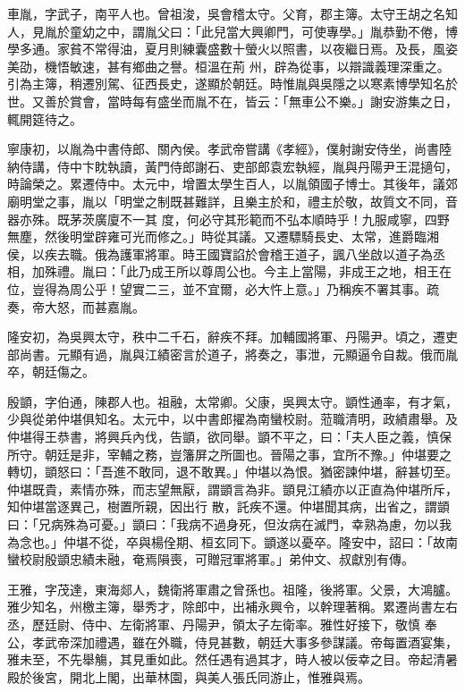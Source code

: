 \begin{pinyinscope}
 車胤，字武子，南平人也。曾祖浚，吳會稽太守。父育，郡主簿。太守王胡之名知人，見胤於童幼之中，謂胤父曰：「此兒當大興卿門，可使專學。」胤恭勤不倦，博學多通。家貧不常得油，夏月則練囊盛數十螢火以照書，以夜繼日焉。及長，風姿美劭，機悟敏速，甚有鄉曲之譽。桓溫在荊
 州，辟為從事，以辯識義理深重之。引為主簿，稍遷別駕、征西長史，遂顯於朝廷。時惟胤與吳隱之以寒素博學知名於世。又善於賞會，當時每有盛坐而胤不在，皆云：「無車公不樂。」謝安游集之日，輒開筵待之。



 寧康初，以胤為中書侍郎、關內侯。孝武帝嘗講《孝經》，僕射謝安侍坐，尚書陸納侍講，侍中卞眈執讀，黃門侍郎謝石、吏部郎袁宏執經，胤與丹陽尹王混擿句，時論榮之。累遷侍中。太元中，增置太學生百人，以胤領國子博士。其後年，議郊廟明堂之事，胤以「明堂之制既甚難詳，且樂主於和，禮主於敬，故質文不同，音器亦殊。既茅茨廣廈不一其
 度，何必守其形範而不弘本順時乎！九服咸寧，四野無塵，然後明堂辟雍可光而修之。」時從其議。又遷驃騎長史、太常，進爵臨湘侯，以疾去職。俄為護軍將軍。時王國寶諂於會稽王道子，諷八坐啟以道子為丞相，加殊禮。胤曰：「此乃成王所以尊周公也。今主上當陽，非成王之地，相王在位，豈得為周公乎！望實二三，並不宜爾，必大忤上意。」乃稱疾不署其事。疏奏，帝大怒，而甚嘉胤。



 隆安初，為吳興太守，秩中二千石，辭疾不拜。加輔國將軍、丹陽尹。頃之，遷吏部尚書。元顯有過，胤與江績密言於道子，將奏之，事泄，元顯逼令自裁。俄而胤卒，朝廷傷之。



 殷顗，字伯通，陳郡人也。祖融，太常卿。父康，吳興太守。顗性通率，有才氣，少與從弟仲堪俱知名。太元中，以中書郎擢為南蠻校尉。蒞職清明，政績肅舉。及仲堪得王恭書，將興兵內伐，告顗，欲同舉。顗不平之，曰：「夫人臣之義，慎保所守。朝廷是非，宰輔之務，豈籓屏之所圖也。晉陽之事，宜所不豫。」仲堪要之轉切，顗怒曰：「吾進不敢同，退不敢異。」仲堪以為恨。猶密諫仲堪，辭甚切至。仲堪既貴，素情亦殊，而志望無厭，謂顗言為非。顗見江績亦以正直為仲堪所斥，知仲堪當逐異己，樹置所親，因出行
 散，託疾不還。仲堪聞其病，出省之，謂顗曰：「兄病殊為可憂。」顗曰：「我病不過身死，但汝病在滅門，幸熟為慮，勿以我為念也。」仲堪不從，卒與楊佺期、桓玄同下。顗遂以憂卒。隆安中，詔曰：「故南蠻校尉殷顗忠績未融，奄焉隕喪，可贈冠軍將軍。」弟仲文、叔獻別有傳。



 王雅，字茂達，東海郯人，魏衛將軍肅之曾孫也。祖隆，後將軍。父景，大鴻臚。雅少知名，州檄主簿，舉秀才，除郎中，出補永興令，以幹理著稱。累遷尚書左右丞，歷廷尉、侍中、左衛將軍、丹陽尹，領太子左衛率。雅性好接下，敬慎
 奉公，孝武帝深加禮遇，雖在外職，侍見甚數，朝廷大事多參謀議。帝每置酒宴集，雅未至，不先舉觴，其見重如此。然任遇有過其才，時人被以佞幸之目。帝起清暑殿於後宮，開北上閣，出華林園，與美人張氏同游止，惟雅與焉。




\end{pinyinscope}
